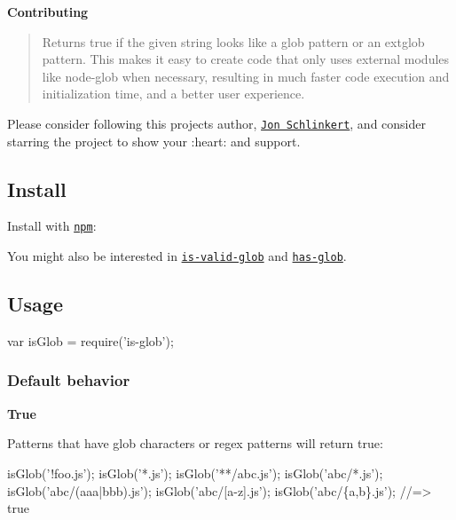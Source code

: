{\bfseries Contributing}

\begin{quote}
Returns {\ttfamily true} if the given string looks like a glob pattern or an extglob pattern. This makes it easy to create code that only uses external modules like node-\/glob when necessary, resulting in much faster code execution and initialization time, and a better user experience. \end{quote}


Please consider following this project\textquotesingle{}s author, \href{https://github.com/jonschlinkert}{\tt Jon Schlinkert}, and consider starring the project to show your \+:heart\+: and support.

\subsection*{Install}

Install with \href{https://www.npmjs.com/}{\tt npm}\+:




You might also be interested in \href{https://github.com/jonschlinkert/is-valid-glob}{\tt is-\/valid-\/glob} and \href{https://github.com/jonschlinkert/has-glob}{\tt has-\/glob}.

\subsection*{Usage}


\begin{DoxyCode}
var isGlob = require('is-glob');
\end{DoxyCode}


\subsubsection*{Default behavior}

{\bfseries True}

Patterns that have glob characters or regex patterns will return {\ttfamily true}\+:


\begin{DoxyCode}
isGlob('!foo.js');
isGlob('*.js');
isGlob('**/abc.js');
isGlob('abc/*.js');
isGlob('abc/(aaa|bbb).js');
isGlob('abc/[a-z].js');
isGlob('abc/\{a,b\}.js');
//=> true
\end{DoxyCode}


